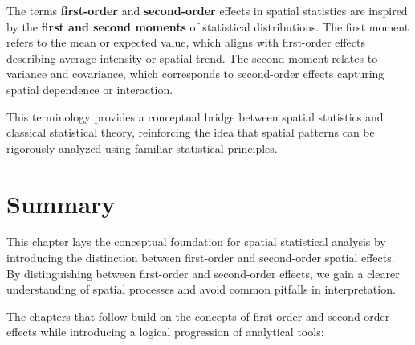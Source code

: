 \documentclass[
  letterpaper,
]{book}
\begin{document}
The terms \textbf{first-order} and \textbf{second-order} effects in
spatial statistics are inspired by the \textbf{first and second moments}
of statistical distributions. The first moment refers to the mean or
expected value, which aligns with first-order effects describing average
intensity or spatial trend. The second moment relates to variance and
covariance, which corresponds to second-order effects capturing spatial
dependence or interaction.

This terminology provides a conceptual bridge between spatial statistics
and classical statistical theory, reinforcing the idea that spatial
patterns can be rigorously analyzed using familiar statistical
principles.

\section{Summary}\label{summary-9}

This chapter lays the conceptual foundation for spatial statistical
analysis by introducing the distinction between first-order and
second-order spatial effects. By distinguishing between first-order and
second-order effects, we gain a clearer understanding of spatial
processes and avoid common pitfalls in interpretation.

The chapters that follow build on the concepts of first-order and
second-order effects while introducing a logical progression of
analytical tools:
\end{document}
